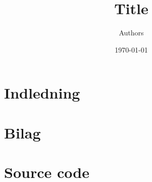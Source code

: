 \documentclass[a4paper, 10pt, danish, final]{article}
\title{Title}
\author{Authors}
\date{\today}
\begin{document}
\maketitle
\thispagestyle{empty}
\pagestyle{headings}

%


\section{Indledning}
%

\newpage
\section*{Bilag} 
\appendix

\section{Source code}
%
\newpage
\end{document}
